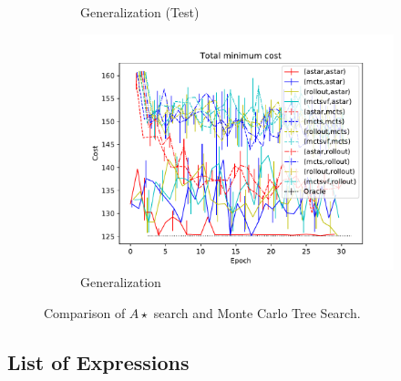 \documentclass[fullpage,twocolumn]{article} %
\begin{document}
\begin{figure}[t!]
\begin{subfigure}[t]{0.33\textwidth}
	    \caption{Generalization (Test)}
	    \label{fig:test-comparison}
	\end{subfigure}
  	\begin{subfigure}[t]{0.33\textwidth}
  		\centering
	    \includegraphics[width=\textwidth]{generalization-compare.pdf}
	    \caption{Generalization}
	    \label{fig:comparison}
	\end{subfigure}
    \caption{Comparison of $A\star$ search and Monte Carlo Tree Search.}
    \label{benchmark-arithmetic}
\end{figure}



\subsection{List of Expressions}
\end{document}
